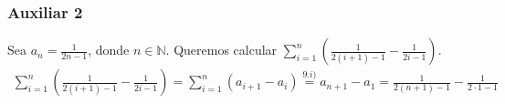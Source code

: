 \begin{enumerate}[label=\roman*)]
\subsubsection*{Auxiliar 2}
Sea $\displaystyle a_n = \frac{1}{2n-1}$, donde $n \in \mathbb{N}$. Queremos calcular $\displaystyle \sum^{n}_{i=1} \left(\frac{1}{2(i+1)-1} - \frac{1}{2i-1}\right)$.
\begin{align*}
\sum^{n}_{i=1} \left( \frac{1}{2(i+1)-1} - \frac{1}{2i-1}\right) =  \sum^{n}_{i=1} \left(a_{i+1}- a_{i} \right) \overset{9.i)}{=} a_{n+1} - a_1 = \frac{1}{2(n+1)-1} - \frac{1}{2\cdot 1-1}  
\end{align*}
\end{enumerate}
